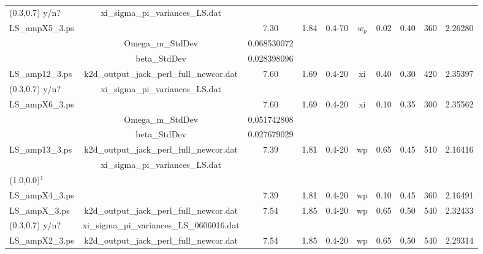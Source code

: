 \documentclass[usenatbib]{mn2e}
\begin{document}
\begin{table}
\begin{center}
\begin{tabular}{lccccccccc}
(0.3,0.7) y/n?  & xi\_sigma\_pi\_variances\_LS.dat          &               &      &         &       &       &       &      & \\
%
LS\_ampX5\_3.ps	&                                           & 7.30          & 1.84 &  0.4-70 & $w_p$ & 0.02  & 0.40  & 360  &  2.26280\\
		& Omega\_m\_StdDev                          & 0.068530072   &      &         &       &       &       &      & \\
		& beta\_StdDev                              & 0.028398096   &      &         &       &       &       &      & \\[8pt]
%
%
LS\_amp12\_3.ps	& k2d\_output\_jack\_perl\_full\_newcor.dat & 7.60          & 1.69 &  0.4-20 & xi   & 0.40   & 0.30 & 420  & 2.35397 \\
(0.3,0.7) y/n?  & xi\_sigma\_pi\_variances\_LS.dat          &               &      &         &      &        &      &      & \\
%
LS\_ampX6\_3.ps	&                                           & 7.60          & 1.69 &  0.4-20 & xi   & 0.10   & 0.35 & 300  &	2.35562 \\
		& Omega\_m\_StdDev                          & 0.051742808   &      &         &      &        &      &      & \\
		& beta\_StdDev                              & 0.027679029   &      &         &      &        &      &      & \\[8pt]
%
%
LS\_amp13\_3.ps	& k2d\_output\_jack\_perl\_full\_newcor.dat &  7.39         & 1.81 &  0.4-20 & wp   & 0.65  & 0.45  & 510  & 2.16416 \\
                & xi\_sigma\_pi\_variances\_LS.dat          &               &      &         &      &       &       &      & \\
(1.0,0.0)$^1$   &                                           &               &      &         &      &       &       &      & \\
%
LS\_ampX4\_3.ps	&                                           &  7.39         & 1.81 &  0.4-20 & wp   & 0.10  & 0.45  & 360  & 2.16491 \\[8pt]
%
%
LS\_ampX\_3.ps  & k2d\_output\_jack\_perl\_full\_newcor.dat & 7.54	    & 1.85 &  0.4-20 & wp   & 0.65  & 0.50  & 540  & 2.32433 \\
(0.3,0.7) y/n?  & xi\_sigma\_pi\_variances\_LS\_0606016.dat &               &      &         &      &       &       &      & \\[8pt]
%
LS\_ampX2\_3.ps & k2d\_output\_jack\_perl\_full\_newcor.dat & 7.54	    & 1.85 &  0.4-20 & wp   & 0.65  & 0.50  & 540  & 2.29314 \\

\end{tabular}
\end{center}
\end{table}
\end{document}

